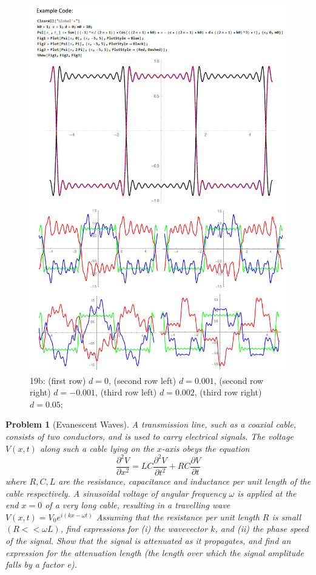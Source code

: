 \documentclass[a4paper]{article}
\theoremstyle{new}
\newtheorem{qns}{Problem}[section]
\begin{document}
\begin{figure}[H]
    \centering
    \includegraphics[width=\linewidth]{19b.pdf}
    \caption{19b: (first row) $d=0$, (second row left) $d=0.001$, (second row right) $d=-0.001$, (third row left) $d=0.002$, (third row right) $d=0.05$;}
\end{figure}
\newpage
\begin{qns}[Evanescent Waves]
A transmission line, such as a coaxial cable, consists of two conductors, and is used to carry electrical signals. The voltage $V(x,t)$ along such a cable lying on the $x$-axis obeys the equation
$$\frac{\partial^2V}{\partial x^2}=LC\frac{\partial^2V}{\partial t^2}+RC\frac{\partial V}{\partial t}$$
where $R,C,L$ are the resistance, capacitance and inductance per unit length of the cable respectively. A sinusoidal voltage of angular frequency $\omega$ is applied at the end $x = 0$ of a very long cable, resulting in a travelling wave $V(x,t)=V_0e^{i(kx-\omega t)}$ Assuming that the resistance per unit length $R$ is small
$(R<<\omega L)$, find expressions for (i) the wavevector $k$, and (ii) the phase speed of the signal. Show that the signal is attenuated as it propagates, and find an expression for the attenuation length (the length over which the signal amplitude falls by a factor e).
\end{qns}
\end{document}
